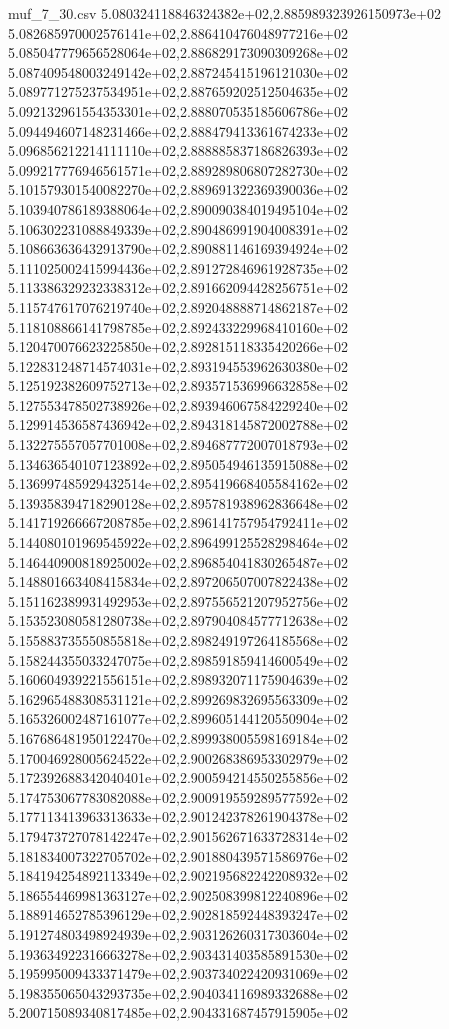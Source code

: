 \begin{filecontents*}{muf_7_30.csv}
5.080324118846324382e+02,2.885989323926150973e+02
5.082685970002576141e+02,2.886410476048977216e+02
5.085047779656528064e+02,2.886829173090309268e+02
5.087409548003249142e+02,2.887245415196121030e+02
5.089771275237534951e+02,2.887659202512504635e+02
5.092132961554353301e+02,2.888070535185606786e+02
5.094494607148231466e+02,2.888479413361674233e+02
5.096856212214111110e+02,2.888885837186826393e+02
5.099217776946561571e+02,2.889289806807282730e+02
5.101579301540082270e+02,2.889691322369390036e+02
5.103940786189388064e+02,2.890090384019495104e+02
5.106302231088849339e+02,2.890486991904008391e+02
5.108663636432913790e+02,2.890881146169394924e+02
5.111025002415994436e+02,2.891272846961928735e+02
5.113386329232338312e+02,2.891662094428256751e+02
5.115747617076219740e+02,2.892048888714862187e+02
5.118108866141798785e+02,2.892433229968410160e+02
5.120470076623225850e+02,2.892815118335420266e+02
5.122831248714574031e+02,2.893194553962630380e+02
5.125192382609752713e+02,2.893571536996632858e+02
5.127553478502738926e+02,2.893946067584229240e+02
5.129914536587436942e+02,2.894318145872002788e+02
5.132275557057701008e+02,2.894687772007018793e+02
5.134636540107123892e+02,2.895054946135915088e+02
5.136997485929432514e+02,2.895419668405584162e+02
5.139358394718290128e+02,2.895781938962836648e+02
5.141719266667208785e+02,2.896141757954792411e+02
5.144080101969545922e+02,2.896499125528298464e+02
5.146440900818925002e+02,2.896854041830265487e+02
5.148801663408415834e+02,2.897206507007822438e+02
5.151162389931492953e+02,2.897556521207952756e+02
5.153523080581280738e+02,2.897904084577712638e+02
5.155883735550855818e+02,2.898249197264185568e+02
5.158244355033247075e+02,2.898591859414600549e+02
5.160604939221556151e+02,2.898932071175904639e+02
5.162965488308531121e+02,2.899269832695563309e+02
5.165326002487161077e+02,2.899605144120550904e+02
5.167686481950122470e+02,2.899938005598169184e+02
5.170046928005624522e+02,2.900268386953302979e+02
5.172392688342040401e+02,2.900594214550255856e+02
5.174753067783082088e+02,2.900919559289577592e+02
5.177113413963313633e+02,2.901242378261904378e+02
5.179473727078142247e+02,2.901562671633728314e+02
5.181834007322705702e+02,2.901880439571586976e+02
5.184194254892113349e+02,2.902195682242208932e+02
5.186554469981363127e+02,2.902508399812240896e+02
5.188914652785396129e+02,2.902818592448393247e+02
5.191274803498924939e+02,2.903126260317303604e+02
5.193634922316663278e+02,2.903431403585891530e+02
5.195995009433371479e+02,2.903734022420931069e+02
5.198355065043293735e+02,2.904034116989332688e+02
5.200715089340817485e+02,2.904331687457915905e+02

\end{filecontents*}
